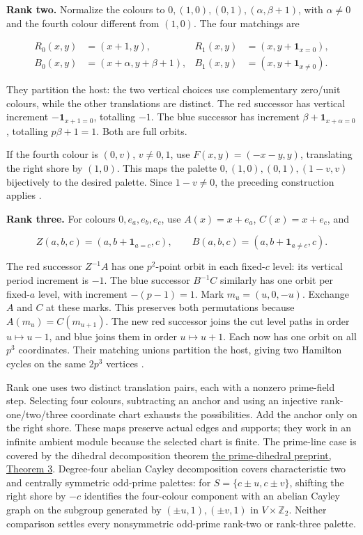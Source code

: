 \documentclass[smallextended]{svjour3}
\begin{document}
\textbf{Rank two.} Normalize the colours to
\(0,(1,0),(0,1),(\alpha,\beta+1)\), with \(\alpha\ne0\) and the fourth
colour different from \((1,0)\). The four matchings are

\[
\begin{aligned}
R_0(x,y)&=(x+1,y),&R_1(x,y)&=(x,y+\mathbf1_{x=0}),\\
B_0(x,y)&=(x+\alpha,y+\beta+1),&
B_1(x,y)&=(x,y+\mathbf1_{x\ne0}).
\end{aligned}
\]

They partition the host: the two vertical choices use complementary
zero/unit colours, while the other translations are distinct. The red
successor has vertical increment \(-\mathbf1_{x+1=0}\), totalling
\(-1\). The blue successor has increment
\(\beta+\mathbf1_{x+\alpha=0}\), totalling \(p\beta+1=1\). Both are full
orbits.

If the fourth colour is \((0,v)\), \(v\ne0,1\), use \(F(x,y)=(-x-y,y)\),
translating the right shore by \((1,0)\). This maps the palette
\(0,(1,0),(0,1),(1-v,v)\) bijectively to the desired palette. Since
\(1-v\ne0\), the preceding construction applies \cite{ref11}.

\textbf{Rank three.} For colours \(0,e_a,e_b,e_c\), use \(A(x)=x+e_a\),
\(C(x)=x+e_c\), and

\[
Z(a,b,c)=(a,b+\mathbf1_{a=c},c),\qquad
B(a,b,c)=(a,b+\mathbf1_{a\ne c},c).
\]

The red successor \(Z^{-1}A\) has one \(p^2\)-point orbit in each
fixed-\(c\) level: its vertical period increment is \(-1\). The blue
successor \(B^{-1}C\) similarly has one orbit per fixed-\(a\) level,
with increment \(-(p-1)=1\). Mark \(m_u=(u,0,-u)\). Exchange \(A\) and
\(C\) at these marks. This preserves both permutations because
\(A(m_u)=C(m_{u+1})\). The new red successor joins the cut level paths
in order \(u\mapsto u-1\), and blue joins them in order
\(u\mapsto u+1\). Each now has one orbit on all \(p^3\) coordinates.
Their matching unions partition the host, giving two Hamilton cycles on
the same \(2p^3\) vertices \cite{ref11}.

Rank one uses two distinct translation pairs, each with a nonzero
prime-field step. Selecting four colours, subtracting an anchor and
using an injective rank-one/two/three coordinate chart exhausts the
possibilities. Add the anchor only on the right shore. These maps
preserve actual edges and supports; they work in an infinite ambient
module because the selected chart is finite. The prime-line case is
covered by the dihedral decomposition theorem
\href{https://arxiv.org/html/1810.07866v1}{the prime-dihedral preprint,
Theorem 3}. Degree-four abelian Cayley decomposition \cite{ref6} covers
characteristic two and centrally symmetric odd-prime palettes: for
\(S=\{c\pm u,c\pm v\}\), shifting the right shore by \(-c\) identifies
the four-colour component with an abelian Cayley graph on the subgroup
generated by \((\pm u,1),(\pm v,1)\) in \(V\times\mathbb Z_2\). Neither
comparison settles every nonsymmetric odd-prime rank-two or rank-three
palette.
\end{document}

